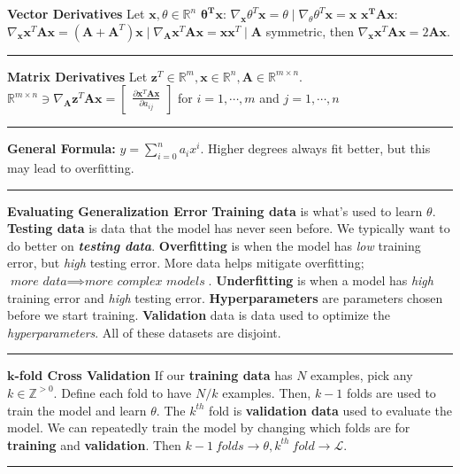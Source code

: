 \documentclass{article}
\newcommand{\R}{\mathbb{R}}
\newcommand{\Z}{\mathbb{Z}}
\newcommand{\A}{\bf{A}}
\newcommand{\x}{\bf{x}}
\newcommand{\z}{\bf{z}}
\renewcommand{\bf}[1]{\textbf{{#1}}}
\renewcommand{\it}[1]{\textit{{#1}}}
\newcommand{\ib}[1]{\textit{\textbf{{#1}}}}
\newcommand{\pd}[2]{\frac{\partial{#1}}{\partial{#2}}}
\newcommand{\grad}[2]{\nabla_{#1}{#2}}
\renewcommand{\L}{\mathcal{L}}
\begin{document}
\begin{small}
\bf{Vector Derivatives}
\newline
Let $\x, \theta \in \R^n$
\newline
\bf{$\bm{\theta^T \x}$}: 
$
\grad{\x}{\theta^T \x} = \theta 
\mid 
\grad{\theta}{\theta^T \x} = \x
$
\newline
\bf{$\bm{\x^T \A \x}$}: 
$
\grad{\x}{\x^T \A \x} = (\A + \A^T) \x
\mid 
\grad{\A}{\x^T \A \x} = \x \x^T
\mid \A$ symmetric, then 
$\grad{\x}{\x^T \A \x} = 2\A \x$.
\hrule
\vspace{0.1em}

\bf{Matrix Derivatives}
\newline
Let $\z^T \in \R^m, \x \in \R^n, \A \in \R^{m \times n}$.
\newline
$
\R^{m \times n} \ni
\grad{\A}{\z^T \A \x} =
\begin{bmatrix}
    \pd{\x^T \A \x}{a_{ij}}
\end{bmatrix}
$ for $i = 1, \cdots, m$ and $j = 1, \cdots, n$
\vspace{0.1em}

\hrule
\vspace{0.1em}

\bf{General Formula:}
\newline
$y = \sum_{i = 0}^{n} a_i x^i$. Higher degrees always fit better, but this may lead to overfitting.
\vspace{0.1em}

\hrule
\vspace{0.1em}

\bf{Evaluating Generalization Error}
\newline
\bf{Training data} is what's used to learn $\theta$. \bf{Testing data} is data that the model has
never seen before. We typically want to do better on \ib{testing data}. \bf{Overfitting} is when the
model has \it{low} training error, but \it{high} testing error. More data helps mitigate
overfitting; $\it{more data} \implies \it{more complex models}$. \bf{Underfitting} is when a model 
has \it{high} training error and \it{high} testing error. \bf{Hyperparameters} are parameters chosen
before we start training. \bf{Validation} data is data used to optimize the \it{hyperparameters}.
All of these datasets are disjoint.
\hrule
\vspace{0.1em}

\bf{$\bm{k}$-fold Cross Validation}
\newline
If our \bf{training data} has $N$ examples, pick any $k \in \Z^{> 0}$. Define each fold to have $N/k$
examples. Then, $k - 1$ folds are used to train the model and learn $\theta$. The $k^{th}$ fold is 
\bf{validation data} used to evaluate the model. We can repeatedly train the model by changing which
folds are for \bf{training} and \bf{validation}. Then 
$k - 1 \ \it{folds} \to \theta, k^{th} \ \it{fold} \to \L$.
\hrule
\vspace{0.1em}


\end{small}
\end{document}
